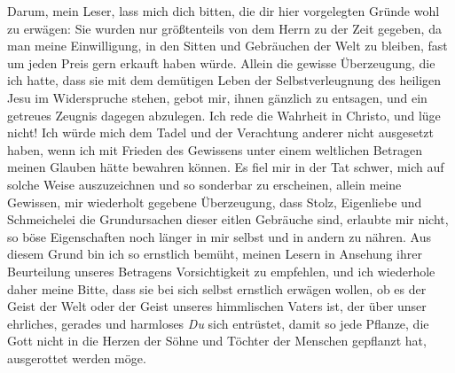 Darum, mein Leser, lass mich dich bitten, die dir hier vorgelegten Gründe wohl zu
erwägen: Sie wurden nur größtenteils von dem Herrn zu der Zeit gegeben, da man
meine Einwilligung, in den Sitten und Gebräuchen der Welt zu bleiben, fast um
jeden Preis gern erkauft haben würde. Allein die gewisse Überzeugung, die ich
hatte, dass sie mit dem demütigen Leben der Selbstverleugnung des heiligen Jesu
im Widerspruche stehen, gebot mir, ihnen gänzlich zu entsagen, und ein getreues
Zeugnis dagegen abzulegen. Ich rede die Wahrheit in
Christo, und lüge nicht! Ich
würde mich dem Tadel und der Verachtung anderer nicht ausgesetzt haben, wenn ich
mit Frieden des Gewissens unter einem weltlichen Betragen meinen Glauben hätte
bewahren können. Es fiel mir in der Tat schwer, mich auf solche Weise
auszuzeichnen und so sonderbar zu erscheinen, allein meine Gewissen, mir
wiederholt gegebene Überzeugung, dass Stolz, Eigenliebe und Schmeichelei die
Grundursachen dieser eitlen Gebräuche sind, erlaubte mir nicht, so böse
Eigenschaften noch länger in mir selbst und in andern zu nähren. Aus diesem
Grund bin ich so ernstlich bemüht, meinen Lesern in Ansehung ihrer
Beurteilung unseres Betragens Vorsichtigkeit zu empfehlen, und ich wiederhole
daher meine Bitte, dass sie bei sich selbst ernstlich erwägen wollen, ob es der
Geist der Welt oder der Geist unseres himmlischen Vaters ist, der über unser
ehrliches, gerades und harmloses \textit{Du} sich entrüstet, damit so jede
Pflanze,
die Gott nicht in die Herzen der Söhne und Töchter der Menschen gepflanzt hat,
ausgerottet werden möge.

\label{kap10_ende}

